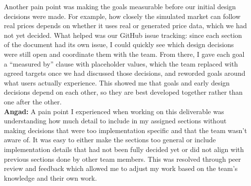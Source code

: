 \documentclass{article}
\begin{document}
Another pain point was making the goals measurable before our initial design decisions were made. For example, how closely the simulated market can follow real prices depends on whether it uses real or generated price data, which we had not yet decided. What helped was our GitHub issue tracking: since each section of the document had its own issue, I could quickly see which design decisions were still open and coordinate them with the team. From there, I gave each goal a ``measured by'' clause with placeholder values, which the team replaced with agreed targets once we had discussed those decisions, and reworded goals around what users actually experience. This showed me that goals and early design decisions depend on each other, so they are best developed together rather than one after the other.
\newline \\
\textbf{Angad:} A pain point I experienced when working on this deliverable was understanding how much detail to include in my assigned sections without making decisions that were too implementation specific and that the team wasn't aware of. It was easy to either make the sections too general or include implementation details that had not been fully decided yet or did not align with previous sections done by other team members. This was resolved through peer review and feedback which allowed me to adjust my work based on the team's knowledge and their own work.
\end{document}
